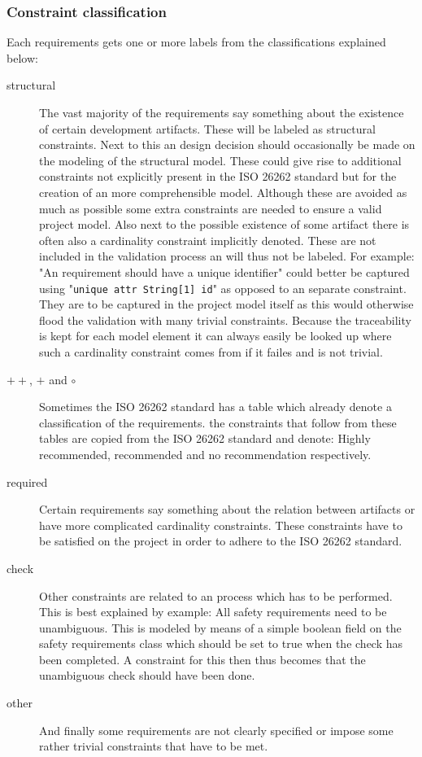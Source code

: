 \documentclass[a4paper]{article}
\newcommand{\ISO}{ISO 26262 standard\xspace}
\begin{document}
\subsubsection{Constraint classification} \label{sec:Constraint classification}
Each requirements gets one or more labels from the classifications explained below:
\begin{description}
\item[structural]
The vast majority of the requirements say something about the existence of certain development artifacts.
These will be labeled as structural constraints.
Next to this an design decision should occasionally be made on the modeling of the structural model.
These could give rise to additional constraints not explicitly present in the \ISO but for the creation of an more comprehensible model.
Although these are avoided as much as possible some extra constraints are needed to ensure a valid project model.
Also next to the possible existence of some artifact there is often also a cardinality constraint implicitly denoted.
These are not included in the validation process an will thus not be labeled.
For example: "An requirement should have a unique identifier" could better be captured using "\texttt{unique attr String[1] id}" as opposed to an separate constraint.
They are to be captured in the project model itself as this would otherwise flood the validation with many trivial constraints.
Because the traceability is kept for each model element it can always easily be looked up where such a cardinality constraint comes from if it failes and is not trivial.

\item[$++$, $+$ and $\circ$]
Sometimes the \ISO has a table which already denote a classification of the requirements.
the constraints that follow from these tables are copied from the \ISO and denote: Highly recommended, recommended and no recommendation respectively.

\item[required]
Certain requirements say something about the relation between artifacts or have more complicated cardinality constraints.
These constraints have to be satisfied on the project in order to adhere to the \ISO.

\item[check]
Other constraints are related to an process which has to be performed.
This is best explained by example:
All safety requirements need to be unambiguous.
This is modeled by means of a simple boolean field on the safety requirements class which should be set to true when the check has been completed.
A constraint for this then thus becomes that the unambiguous check should have been done.

\item[other] %
And finally some requirements are not clearly specified or impose some rather trivial constraints that have to be met.
\end{description}
\end{document}
